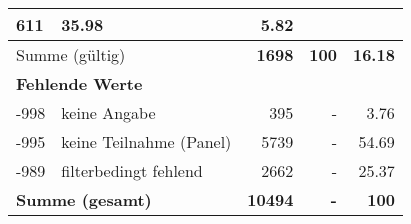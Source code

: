 \begin{longtable}{lXrrr}
       \num{611} &
       \num[round-mode=places,round-precision=2]{35,98} &
         \num[round-mode=places,round-precision=2]{5,82} \\
     \midrule
     \multicolumn{2}{l}{Summe (gültig)} &
       \textbf{\num{1698}} &
     \textbf{100} &
       \textbf{\num[round-mode=places,round-precision=2]{16,18}} \\
     \multicolumn{5}{l}{\textbf{Fehlende Werte}}\\
       -998 &
       keine Angabe &
         \num{395} &
        - &
         \num[round-mode=places,round-precision=2]{3,76} \\
       -995 &
       keine Teilnahme (Panel) &
         \num{5739} &
        - &
         \num[round-mode=places,round-precision=2]{54,69} \\
       -989 &
       filterbedingt fehlend &
         \num{2662} &
        - &
         \num[round-mode=places,round-precision=2]{25,37} \\
     \midrule
     \multicolumn{2}{l}{\textbf{Summe (gesamt)}} &
          \textbf{\num{10494}} &
        \textbf{-} &
        \textbf{100} \\
     \bottomrule
     \end{longtable}
     
